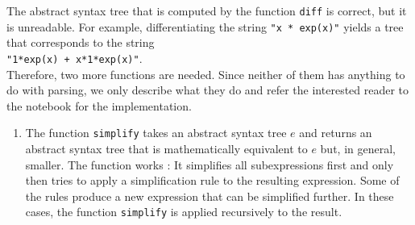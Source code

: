 \noindent
The abstract syntax tree that is computed by the function \texttt{diff} is correct, but it is unreadable.
For example, differentiating the string \texttt{"x * exp(x)"} yields a tree that corresponds to the
string
\\[0.2cm]
\hspace*{1.3cm}
\texttt{"1*exp(x) + x*1*exp(x)"}.
\\[0.2cm]
Therefore, two more functions are needed.  Since neither of them has anything to do with parsing, we only
describe what they do and refer the interested reader to the notebook for the implementation.
\begin{enumerate}
\item The function \texttt{simplify} takes an abstract syntax tree $e$ and returns an abstract syntax tree
      that is mathematically equivalent to $e$ but, in general, smaller.  The function works
      :  It simplifies all subexpressions first and only then tries to apply a
      simplification rule to the resulting expression.  Some of the rules produce a new expression that
      can be simplified further.  In these cases, the function \texttt{simplify} is applied recursively to
      the result.


\end{enumerate}

